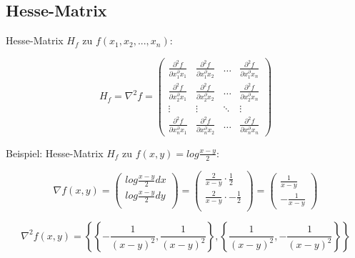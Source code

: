 \subsection{Hesse-Matrix} %
\label{sub:hesse_matrix}
Hesse-Matrix $H_f$ zu $f(x_1,x_2,...,x_n)$: 

\begin{equation}
	H_f = \nabla^2f = \left( \begin{array}{cccc}
		\frac{\partial^2 f}{\partial x_1^\partial x_1} & \frac{\partial^2 f}{\partial x_1^\partial x_2} 
		& \dots & \frac{\partial^2 f}{\partial x_1^\partial x_n} \\
		
		\frac{\partial^2 f}{\partial x_2^\partial x_1} & \frac{\partial^2 f}{\partial x_2^\partial x_2} 
		& \dots & \frac{\partial^2 f}{\partial x_2^\partial x_n} \\	
		\vdots & \vdots & \ddots & \vdots \\
		\frac{\partial^2 f}{\partial x_n^\partial x_1} & \frac{\partial^2 f}{\partial x_n^\partial x_2} 
		& \dots & \frac{\partial^2 f}{\partial x_n^\partial x_n}
	\end{array}\right)
\end{equation}

Beispiel:
Hesse-Matrix $H_f$ zu $f(x,y)=log\frac{x-y}{2}$:

\begin{equation*}
  \nabla f(x,y) =
  \left(
    \begin{array}{c}
      log\frac{x-y}{2} dx\\
      log\frac{x-y}{2} dy\\
    \end{array}
  \right) =
  \left(
    \begin{array}{c}
      \frac{2}{x-y} \cdot \frac{1}{2}\\
      \frac{2}{x-y} \cdot -\frac{1}{2}\\
    \end{array}
  \right) =
  \left(
    \begin{array}{c}
      \frac{1}{x-y}\\
      -\frac{1}{x-y}
    \end{array}
  \right)
\end{equation*}


\begin{equation*}
  \nabla^2 f(x,y) =
\left\{\left\{-\frac{1}{(x-y)^2},\frac{1}{(x-y)^2}\right\},\left\{\frac{1}{(x-y)^2},-\frac{1}{(x-y)^2}\right\}\right\}
\end{equation*}
  

